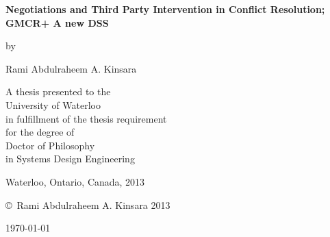 \documentclass[letterpaper,12pt,titlepage,oneside,final]{book}
\begin{document}
\begin{titlepage}
        \begin{center}
        \vspace*{0.5cm}

        \Huge
        {\bf Negotiations and Third Party Intervention in Conflict Resolution; GMCR+ A new DSS}

        \vspace*{0.5cm}

        \normalsize
        by \\

        \vspace*{0.5cm}

        \Large
        Rami Abdulraheem A. Kinsara \\
        \vspace*{0.5cm}

        \normalsize
        A thesis presented to the \\ University of Waterloo \\ in fulfillment of the thesis requirement \\ for the degree of \\ Doctor of Philosophy \\ in Systems Design Engineering \\

        \vspace*{0.5cm}

        Waterloo, Ontario, Canada, 2013 \\

        \vspace*{0.5cm}

        \copyright\ Rami Abdulraheem A. Kinsara 2013 \\
        
        \vspace{0.5cm}
        
	\today    
	     
        \end{center}
\end{titlepage}
\end{document}

